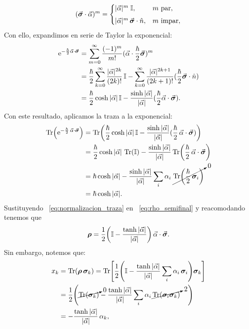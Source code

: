 \documentclass[../Main.tex]{subfiles}
\begin{document}
\begin{equation}
(\vec{\bm{\sigma}}\cdot\vec{\alpha})^{m}
=
\begin{cases}
|\vec{\alpha}|^{m} \;\mathbb{I},
& m \ \text{par}, \\[4pt]
|\vec{\alpha}|^{m}\,
\vec{\bm{\sigma}}\cdot\hat{n},
& m \ \text{impar},
\end{cases}
\end{equation}
Con ello, expandimos en serie de Taylor la exponencial:
\begin{align}
\mathrm{e}^{-\frac{\hbar}{2}\vec{\alpha}\cdot\vec{\bm{\sigma}}}
&=
\sum_{m=0}^{\infty}
\frac{(-1)^m}{m!}
(\vec{\alpha}\cdot\frac{\hbar}{2}\vec{\bm{\sigma}})^{m}
\notag \\
&=
\frac{\hbar}{2}\sum_{k=0}^{\infty}
\frac{|\vec{\alpha}|^{2k}}{(2k)!}\,\mathbb{I}
-
\sum_{k=0}^{\infty}
\frac{|\vec{\alpha}|^{2k+1}}{(2k+1)!}
(\frac{\hbar}{2}\vec{\bm{\sigma}}\cdot\hat{n})
\notag \\
&=
\frac{\hbar}{2}\cosh|\vec{\alpha}|\,\mathbb{I}
-
\frac{\sinh|\vec{\alpha}|}{|\vec{\alpha}|}
(\frac{\hbar}{2}\vec{\alpha}\cdot\vec{\bm{\sigma}}).
\label{eq:expansion_exponencial}
\end{align}
Con este resultado, aplicamos la traza a la exponencial:
\begin{align}
\Tr\!\qty(\mathrm{e}^{-\frac{\hbar}{2}\,\vec{\alpha}\cdot\vec{\bm{\sigma}}})
&=
\Tr\!\qty(\frac{\hbar}{2}
\cosh|\vec{\alpha}|\,\mathbb{I}
-
\frac{\sinh|\vec{\alpha}|}{|\vec{\alpha}|}
(\frac{\hbar}{2}\,\vec{\alpha}\cdot\vec{\bm{\sigma}})
)
\notag \\
&=
\frac{\hbar}{2}\cosh|\vec{\alpha}|\,\Tr(\mathbb{I})
-
\frac{\sinh|\vec{\alpha}|}{|\vec{\alpha}|}
\Tr(\frac{\hbar}{2}\,\vec{\alpha}\cdot\vec{\bm{\sigma}})
\notag \\
&=
\hbar\cosh|\vec{\alpha}|
-
\frac{\sinh|\vec{\alpha}|}{|\vec{\alpha}|}
\sum_i \alpha_i\; \cancelto{0}{\Tr(\frac{\hbar}{2}\,\bm{\sigma}_i)}
\notag \\
&=
\hbar\cosh|\vec{\alpha}|.
\label{eq:normalizacion_traza}
\end{align}
Sustituyendo ~\eqref{eq:normalizacion_traza} en ~\eqref{eq:rho_semifinal} y reacomodando tenemos que
\begin{equation}
    \bm{\rho} = \frac{1}{2}\qty(\mathbb{I} - \frac{\tanh{|\vec{\alpha}|}}{|\vec{\alpha}|})\,\vec{\alpha}\cdot\vec{\bm{\sigma}}.
    \label{eq:rho_semi_semifinal}
\end{equation}
Sin embargo, notemos que:
\begin{align}
    x_k 
    &= \Tr(\bm{\rho}\,\bm{\sigma}_k)
    = \Tr\!\qty[\frac{1}{2}\qty(\mathbb{I} - \frac{\tanh |\vec{\alpha}|}{|\vec{\alpha}|}\sum_i \alpha_i\,\bm{\sigma}_i )\bm{\sigma}_k]
    \notag \\
    &= \frac{1}{2}\qty(\cancelto{0}{\Tr(\bm{\sigma}_k)}
    - \frac{\tanh |\vec{\alpha}|}{|\vec{\alpha}|}
    \sum_i \alpha_i \,\cancelto{2}{\Tr(\bm{\sigma}_i\bm{\sigma}_k)}\hspace{0.4cm})\notag\\
    &= -\frac{\tanh |\vec{\alpha}|}{|\vec{\alpha}|}\,\alpha_k ,
\end{align}
\end{document}
